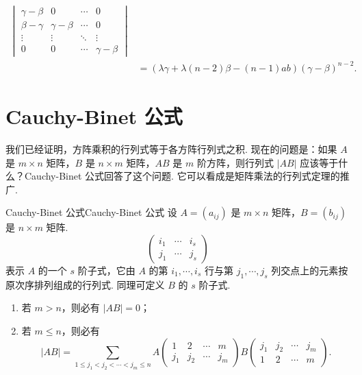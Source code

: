 \begin{enumerate}
\begin{solution}
\begin{align*}
\begin{vmatrix}
                                               \gamma-\beta & 0            & \cdots & 0            \\
                                               \beta-\gamma & \gamma-\beta & \cdots & 0            \\
                                               \vdots       & \vdots       & \ddots & \vdots       \\
                                               0            & 0            & \cdots & \gamma-\beta
                                           \end{vmatrix}           \\
                    & =(\lambda \gamma+\lambda(n-2)\beta-(n-1)ab)(\gamma-\beta)^{n-2}.
            \end{align*}
        \end{solution}

\end{enumerate}

\section{Cauchy-Binet 公式}

我们已经证明，方阵乘积的行列式等于各方阵行列式之积. 现在的问题是：如果 $A$ 是 $m \times n$ 矩阵，$B$ 是 $n \times m$ 矩阵，$AB$ 是 $m$ 阶方阵，则行列式 $|AB|$ 应该等于什么？Cauchy-Binet 公式回答了这个问题. 它可以看成是矩阵乘法的行列式定理的推广.

\begin{theorem}{Cauchy-Binet 公式}{Cauchy-Binet 公式}
    设 $A = (a_{ij})$ 是 $m \times n$ 矩阵，$B = (b_{ij})$ 是 $n \times m$ 矩阵.
    \[
    \begin{pmatrix}
    i_1 & \cdots & i_s \\
    j_1 & \cdots & j_s
    \end{pmatrix}
    \]
    表示 $A$ 的一个 $s$ 阶子式，它由 $A$ 的第 $i_1, \cdots, i_s$ 行与第 $j_1, \cdots, j_s$ 列交点上的元素按原次序排列组成的行列式. 同理可定义 $B$ 的 $s$ 阶子式.
    \begin{enumerate}
        \item 若 $m > n$，则必有 $|AB| = 0$；
        \item 若 $m \leqslant n$，则必有
        \[
        |AB| = \sum_{1 \leqslant j_1 < j_2 < \cdots < j_m \leqslant n} A
        \begin{pmatrix}
        1 & 2 & \cdots & m \\
        j_1 & j_2 & \cdots & j_m
        \end{pmatrix}
        B
        \begin{pmatrix}
        j_1 & j_2 & \cdots & j_m \\
        1 & 2 & \cdots & m
        \end{pmatrix}.
        \]
    \end{enumerate}
\end{theorem}

